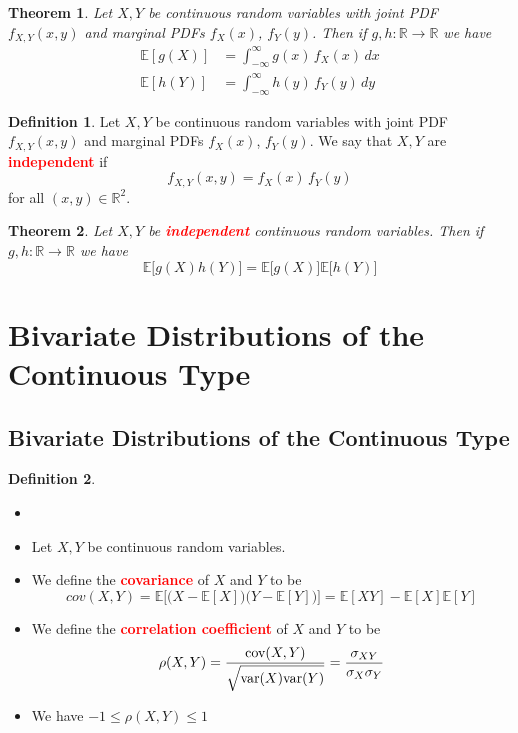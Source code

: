 \documentclass{article}
\newcommand{\R}{\mathbb{R}}
\newcommand{\E}{\mathbb{E}}
\newcommand{\var}{\text{var}}
\newcommand{\cov}{\text{cov}}
\newcommand{\bfred}[1]{\textcolor{red}{\textbf{#1}}}
\theoremstyle{plain}
\newtheorem{thm}{Theorem}[section]
\theoremstyle{definition}
\newtheorem{defn}{Definition}[section]
\theoremstyle{remark}
\begin{document}
\begin{thm}
    Let $X,Y$ be continuous random variables with joint PDF $f_{X,Y}(x,y)$ and marginal PDFs $f_X(x)$, $f_Y(y)$. Then if $g,h:\R\rightarrow\R$ we have 
    \begin{align*}
        \E[g(X)] &= \int_{-\infty}^{\infty}g(x)\,f_X(x)\,dx \\
        \E[h(Y)] &= \int_{-\infty}^{\infty}h(y)\,f_Y(y)\,dy
    \end{align*}
\end{thm}

\begin{defn}
    Let $X,Y$ be continuous random variables with joint PDF $f_{X,Y}(x,y)$ and marginal PDFs $f_X(x)$, $f_Y(y)$. We say that $X,Y$ are \bfred{independent} if \[f_{X,Y}(x,y)=f_X(x)\,f_Y(y)\] for all $(x,y)\in\R^2$.
\end{defn}

\begin{thm}
    Let $X,Y$ be \bfred{independent} continuous random variables. Then if $g,h:\R\rightarrow\R$ we have \[\E\bigr[g(X)h(Y)\bigr]=\E\bigr[g(X)\bigr]\E\bigr[h(Y)\bigr]\]
\end{thm}

\section{Bivariate Distributions of the Continuous Type}

\subsection{Bivariate Distributions of the Continuous Type}

\begin{defn}
    \begin{itemize}
        \item[]
        \item Let $X,Y$ be continuous random variables.
        \item We define the \bfred{covariance} of $X$ and $Y$ to be \[cov(X,Y)=\E\bigr[\bigr(X-\E[X]\bigr)(Y-\E[Y]\bigr)\bigr]=\E[XY]-\E[X]\E[Y]\]
        \item We define the \bfred{correlation coefficient} of $X$ and $Y$ to be \[\rho(X,Y)=\frac{\cov(X,Y)}{\sqrt{\var(X)\var(Y)\vphantom{\bigr\vert}}} = \frac{\sigma_{XY}}{\sigma_X\sigma_Y}\]
        \item We have $-1\leq\rho(X,Y)\leq1$
    \end{itemize}
\end{defn}
\end{document}

